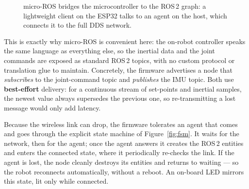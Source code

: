 \begin{figure}[ht]
  \centering
  \caption{micro-ROS bridges the microcontroller to the ROS\,2 graph: a
           lightweight client on the ESP32 talks to an agent on the host,
           which connects it to the full DDS network.}
  \label{fig:microros}
\end{figure}

This is exactly why micro-ROS is convenient here: the on-robot controller
speaks the same language as everything else, so the inertial data and the
joint commands are exposed as standard ROS\,2 topics, with no custom
protocol or translation glue to maintain. Concretely, the firmware
advertises a node that \emph{subscribes} to the joint-command topic and
\emph{publishes} the IMU topic. Both use \textbf{best-effort} delivery:
for a continuous stream of set-points and inertial samples, the newest
value always supersedes the previous one, so re-transmitting a lost
message would only add latency.

Because the wireless link can drop, the firmware tolerates an agent that
comes and goes through the explicit state machine of
Figure~\ref{fig:fsm}. It waits for the network, then for the agent; once
the agent answers it creates the ROS\,2 entities and enters the connected
state, where it periodically re-checks the link. If the agent is lost,
the node cleanly destroys its entities and returns to waiting --- so the
robot reconnects automatically, without a reboot. An on-board LED mirrors
this state, lit only while connected.

